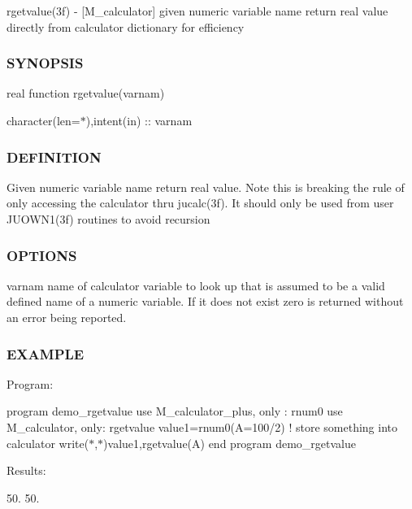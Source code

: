 rgetvalue(3f) -\/ \mbox{[}M\+\_\+calculator\mbox{]} given numeric variable name return real value directly from calculator dictionary for efficiency \subsubsection*{S\+Y\+N\+O\+P\+S\+IS}

real function rgetvalue(varnam)

character(len=$\ast$),intent(in) \+:\+: varnam

\subsubsection*{D\+E\+F\+I\+N\+I\+T\+I\+ON}

Given numeric variable name return real value. Note this is breaking the rule of only accessing the calculator thru jucalc(3f). It should only be used from user J\+U\+O\+W\+N1(3f) routines to avoid recursion \subsubsection*{O\+P\+T\+I\+O\+NS}

varnam name of calculator variable to look up that is assumed to be a valid defined name of a numeric variable. If it does not exist zero is returned without an error being reported.

\subsubsection*{E\+X\+A\+M\+P\+LE}

Program\+:

program demo\+\_\+rgetvalue use M\+\_\+calculator\+\_\+plus, only \+: rnum0 use M\+\_\+calculator, only\+: rgetvalue value1=rnum0(\textquotesingle{}A=100/2\textquotesingle{}) ! store something into calculator write($\ast$,$\ast$)value1,rgetvalue(\textquotesingle{}A\textquotesingle{}) end program demo\+\_\+rgetvalue

Results\+:

50. 50. \mbox{\label{namespacem__calculator_ade5ed0d5db38a14b2c521bc268756f39}} 
